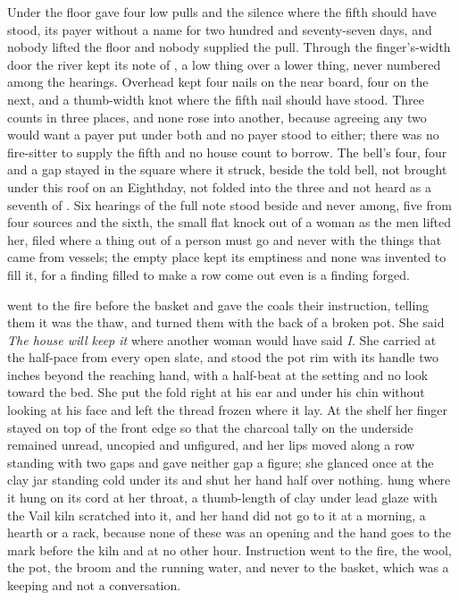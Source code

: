 Under the floor  gave four low pulls and the silence where the fifth should have stood, its payer without a name for two hundred and seventy-seven days, and nobody lifted the floor and nobody supplied the pull. Through the finger's-width door the river kept its note of , a low thing over a lower thing, never numbered among the hearings. Overhead  kept four nails on the near board, four on the next, and a thumb-width knot where the fifth nail should have stood. Three counts in three places, and none rose into another, because agreeing any two would want a payer put under both and no payer stood to either; there was no fire-sitter to supply the fifth and no house count to borrow. The bell's four, four and a gap stayed in the square where it struck, beside the told bell, not brought under this roof on an Eighthday, not folded into the three and not heard as a seventh of . Six hearings of the full note stood beside and never among, five from four sources and the sixth, the small flat knock out of a woman as the men lifted her, filed where a thing out of a person must go and never with the things that came from vessels; the empty place kept its emptiness and none was invented to fill it, for a finding filled to make a row come out even is a finding forged.

 went to the fire before the basket and gave the coals their instruction, telling them it was the thaw, and turned them with the back of a broken pot. She said \emph{The house will keep it} where another woman would have said \emph{I}. She carried at the half-pace from every open slate, and stood the pot rim with its handle two inches beyond the reaching hand, with a half-beat at the setting and no look toward the bed. She put the fold right at his ear and under his chin without looking at his face and left the thread frozen where it lay. At the shelf her finger stayed on top of the front edge so that the charcoal tally on the underside remained unread, uncopied and unfigured, and her lips moved along a row standing with two gaps and gave neither gap a figure; she glanced once at the clay jar standing cold under its  and shut her hand half over nothing.  hung where it hung on its cord at her throat, a thumb-length of clay under lead glaze with the Vail kiln scratched into it, and her hand did not go to it at a morning, a hearth or a rack, because none of these was an opening and the hand goes to the mark before the kiln and at no other hour. Instruction went to the fire, the wool, the pot, the broom and the running water, and never to the basket, which was a keeping and not a conversation.

